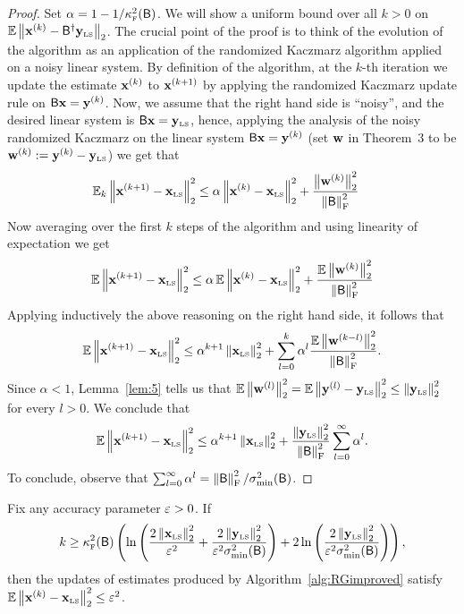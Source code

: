 \begin{proof}
Set $\alpha = 1 - 1/\kappaFS(\matB)$. We will show a uniform bound over all $k>0$ on $\EE \norm{\x^{(k)} - \pinv{\matB} \yls}$. The crucial point of the proof is to think of the evolution of the algorithm as an application of the randomized Kaczmarz algorithm applied on a noisy linear system. By definition of the algorithm, at the $k$-th iteration we update the estimate $\x^{(k)}$ to $\x^{(k+1)}$ by applying the randomized Kaczmarz update rule on $\matB \x = \y^{(k)}$. Now, we assume that the right hand side is ``noisy'', and the desired linear system is $\matB\x = \yls$, hence, applying the analysis of the noisy randomized Kaczmarz on the linear system $\matB \x = \y^{(k)}$ (set $\w$ in Theorem~3 to be $\w^{(k)}:=\y^{(k)} - \yls$) we get that
\begin{align}
		\EE_k \norm{\x^{(k + 1)} - \xls}^2 & \leq \alpha \norm{\x^{(k)} - \xls}^2 + \frac{\norm{\w^{(k)}}^2}{\frobnorm{\matB }^2}
\end{align}
Now averaging over the first $k$ steps of the algorithm and using linearity of expectation we get
\[		\EE \norm{\x^{(k + 1)} - \xls}^2  \leq  \alpha \EE\norm{\x^{(k)} - \xls}^2 + \frac{\EE\norm{\w^{(k)}}^2}{\frobnorm{\matB }^2} \]
Applying inductively the above reasoning on the right hand side, it follows that
\begin{equation}\label{ineq:generic}
\EE \norm{\x^{(k + 1)} - \xls}^2  \leq  \alpha^{k+1} \norm{\xls}^2 + \sum_{l=0}^{k}\alpha^l \frac{\EE\norm{\w^{(k-l)}}^2}{\frobnorm{\matB }^2}.
\end{equation}
Since $\alpha <1$, Lemma~\ref{lem:5} tells us that $\EE \norm{\w^{(l)}}^2 = \EE \norm{\y^{(l)} - \yls}^2 \leq  \norm{\yls}^2 $ for every $l>0$. We conclude that
\[
\EE \norm{\x^{(k + 1)} - \xls}^2  \leq  \alpha^{k+1}\norm{\xls}^2 + \frac{\norm{\yls}^2}{\frobnorm{\matB }^2}\sum_{l=0}^{\infty}\alpha^l.
\]
To conclude, observe that $\sum_{l=0}^{\infty}\alpha^l = \frobnorm{\matB}^2/\sigma_{\min}^2(\matB)$.
\end{proof}
%
%
\begin{lemma}\label{lem:7}
Fix any accuracy parameter $\eps>0$. If
\[k\geq \kappaFS(\matB)\left(\ln\left(\frac{2\norm{\xls}^2}{\eps^2} + \frac{2\norm{\yls}^2}{\eps^2\sigma_{\min}^2(\matB)} \right)
+
2\ln\left( \frac{2\norm{\yls}^2}{\eps^2\sigma_{\min}^2(\matB)} \right)\right),\]
then the updates of estimates produced by Algorithm~\ref{alg:RGimproved} satisfy $\EE \norm{\x^{(k)} - \xls }^2 \leq \eps^2$.
\end{lemma}
